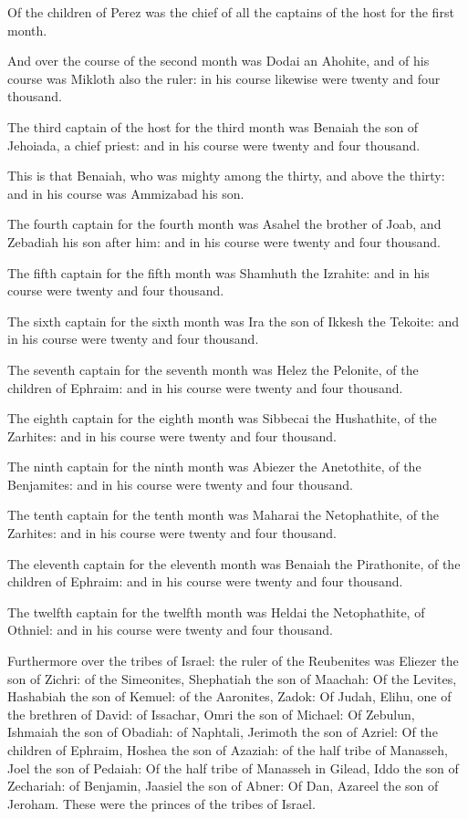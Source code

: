 \Verse Of the children of Perez was the chief of all the captains of the host for the first month.

\Verse And over the course of the second month was Dodai an Ahohite, and of his course was Mikloth also the ruler: in his course likewise were twenty and four thousand.

\Verse The third captain of the host for the third month was Benaiah the son of Jehoiada, a chief priest: and in his course were twenty and four thousand.

\Verse This is that Benaiah, who was mighty among the thirty, and above the thirty: and in his course was Ammizabad his son.

\Verse The fourth captain for the fourth month was Asahel the brother of Joab, and Zebadiah his son after him: and in his course were twenty and four thousand.

\Verse The fifth captain for the fifth month was Shamhuth the Izrahite: and in his course were twenty and four thousand.

\Verse The sixth captain for the sixth month was Ira the son of Ikkesh the Tekoite: and in his course were twenty and four thousand.

\Verse The seventh captain for the seventh month was Helez the Pelonite, of the children of Ephraim: and in his course were twenty and four thousand.

\Verse The eighth captain for the eighth month was Sibbecai the Hushathite, of the Zarhites: and in his course were twenty and four thousand.

\Verse The ninth captain for the ninth month was Abiezer the Anetothite, of the Benjamites: and in his course were twenty and four thousand.

\Verse The tenth captain for the tenth month was Maharai the Netophathite, of the Zarhites: and in his course were twenty and four thousand.

\Verse The eleventh captain for the eleventh month was Benaiah the Pirathonite, of the children of Ephraim: and in his course were twenty and four thousand.

\Verse The twelfth captain for the twelfth month was Heldai the Netophathite, of Othniel: and in his course were twenty and four thousand.

\Verse Furthermore over the tribes of Israel: the ruler of the Reubenites was Eliezer the son of Zichri: of the Simeonites, Shephatiah the son of Maachah: \Verse Of the Levites, Hashabiah the son of Kemuel: of the Aaronites, Zadok: \Verse Of Judah, Elihu, one of the brethren of David: of Issachar, Omri the son of Michael: \Verse Of Zebulun, Ishmaiah the son of Obadiah: of Naphtali, Jerimoth the son of Azriel: \Verse Of the children of Ephraim, Hoshea the son of Azaziah: of the half tribe of Manasseh, Joel the son of Pedaiah: \Verse Of the half tribe of Manasseh in Gilead, Iddo the son of Zechariah: of Benjamin, Jaasiel the son of Abner: \Verse Of Dan, Azareel the son of Jeroham. These were the princes of the tribes of Israel.

